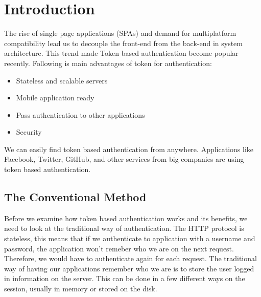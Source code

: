 \documentclass[journal,article,submit,moreauthors,pdftex,10pt,a4paper]{mdpi}
\begin{document}


\section{Introduction}

The rise of single page applications (SPAs) and demand for multiplatform compatibility lead us to decouple the front-end from the back-end in system architecture. This trend made Token based authentication become popular recently\cite{authentication}. Following is main advantages of token for authentication:
\begin{itemize}[leftmargin=*,labelsep=4mm]
\item	Stateless and scalable servers
\item	Mobile application ready
\item	Pass authentication to other applications
\item	Security
\end{itemize}

We can easily find token based authentication from anywhere. Applications like Facebook, Twitter, GitHub, and other services from big companies are using token based authentication.

\subsection{The Conventional Method}
Before we examine how token based authentication works and its benefits, we need to look at the traditional way of authentication.
The HTTP protocol is stateless, this means that if we authenticate to application with a username and password, the application won’t remeber who we are on the next request. Therefore, we would have to authenticate again for each request. The traditional way of having our applications remember who we are is to store the user logged in information on the server. This can be done in a few different ways on the session, usually in memory or stored on the disk\cite{authorization}.
\end{document}

